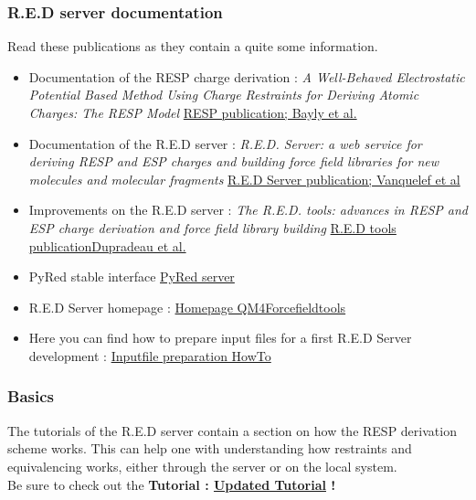 \documentclass[a4paper]{article}
\begin{document}
\subsubsection{R.E.D server documentation}\label{sec:reddocs}
Read these publications as they contain a quite some information.
\begin{itemize}
    \item Documentation of the RESP charge derivation : \textit{A Well-Behaved Electrostatic Potential Based Method Using Charge Restraints for Deriving Atomic Charges: The RESP Model} \href{https://pubs.acs.org/doi/10.1021/j100142a004}{RESP publication; Bayly et al.}
    \item Documentation of the R.E.D server : \textit{R.E.D. Server: a web service for deriving RESP and ESP charges and building force field libraries for new molecules and molecular fragments} \href{https://pubmed.ncbi.nlm.nih.gov/21609950/}{R.E.D Server publication; Vanquelef et al}
    \item Improvements on the R.E.D server : \textit{The R.E.D. tools: advances in RESP and ESP charge derivation and force field library building} \href{https://pubs.rsc.org/en/content/articlelanding/2010/cp/c0cp00111b}{R.E.D tools publicationDupradeau et al.}
    \item PyRed stable interface \href{https://upjv.q4md-forcefieldtools.org/REDServer-Development/}{PyRed server}
    \item R.E.D Server homepage : \href{https://upjv.q4md-forcefieldtools.org/}{Homepage QM4Forcefieldtools}
    \item Here you can find how to prepare input files for a first R.E.D Server development : \href{https://upjv.q4md-forcefieldtools.org/Tutorial/Mini-HowTo-InputFiles.pdf}{Inputfile preparation HowTo} \end{itemize}

\subsubsection{Basics}
The tutorials of the R.E.D server contain a section on how the RESP derivation scheme works. This can help one with understanding how restraints and equivalencing works, either through the server or on the local system.\\
Be sure to check out the \textbf{Tutorial : \href{https://upjv.q4md-forcefieldtools.org/Tutorial/Tutorial-4.php}{Updated Tutorial} !}
\end{document}

